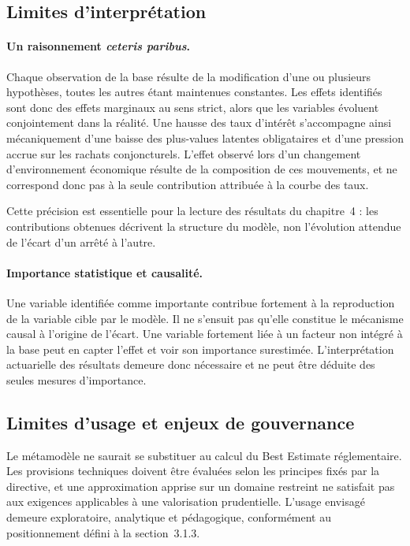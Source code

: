 \subsection{Limites d'interprétation}

\paragraph{Un raisonnement \emph{ceteris paribus}.} Chaque observation de la base résulte de la modification d'une ou plusieurs hypothèses, toutes les autres étant maintenues constantes. Les effets identifiés sont donc des effets marginaux au sens strict, alors que les variables évoluent conjointement dans la réalité. Une hausse des taux d'intérêt s'accompagne ainsi mécaniquement d'une baisse des plus-values latentes obligataires et d'une pression accrue sur les rachats conjoncturels. L'effet observé lors d'un changement d'environnement économique résulte de la composition de ces mouvements, et ne correspond donc pas à la seule contribution attribuée à la courbe des taux.

Cette précision est essentielle pour la lecture des résultats du chapitre~4 : les contributions obtenues décrivent la structure du modèle, non l'évolution attendue de l'écart d'un arrêté à l'autre.

\paragraph{Importance statistique et causalité.} Une variable identifiée comme importante contribue fortement à la reproduction de la variable cible par le modèle. Il ne s'ensuit pas qu'elle constitue le mécanisme causal à l'origine de l'écart. Une variable fortement liée à un facteur non intégré à la base peut en capter l'effet et voir son importance surestimée. L'interprétation actuarielle des résultats demeure donc nécessaire et ne peut être déduite des seules mesures d'importance.

\subsection{Limites d'usage et enjeux de gouvernance}

Le métamodèle ne saurait se substituer au calcul du Best Estimate réglementaire. Les provisions techniques doivent être évaluées selon les principes fixés par la directive, et une approximation apprise sur un domaine restreint ne satisfait pas aux exigences applicables à une valorisation prudentielle. L'usage envisagé demeure exploratoire, analytique et pédagogique, conformément au positionnement défini à la section~3.1.3.

